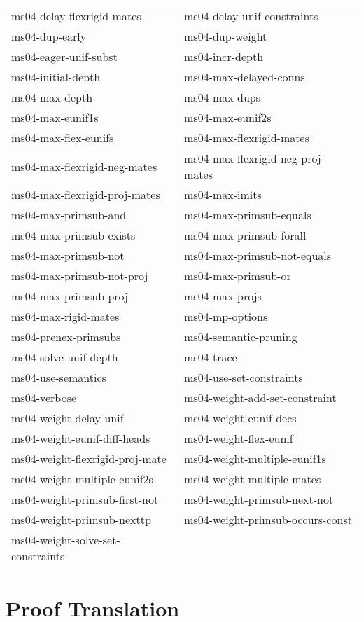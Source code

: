 \begin{description}
\begin{tabular}{l l}
ms04-delay-flexrigid-mates&ms04-delay-unif-constraints\\
ms04-dup-early&ms04-dup-weight\\
ms04-eager-unif-subst&ms04-incr-depth\\
ms04-initial-depth&ms04-max-delayed-conns\\
ms04-max-depth&ms04-max-dups\\
ms04-max-eunif1s&ms04-max-eunif2s\\
ms04-max-flex-eunifs&ms04-max-flexrigid-mates\\
ms04-max-flexrigid-neg-mates&ms04-max-flexrigid-neg-proj-mates\\
ms04-max-flexrigid-proj-mates&ms04-max-imits\\
ms04-max-primsub-and&ms04-max-primsub-equals\\
ms04-max-primsub-exists&ms04-max-primsub-forall\\
ms04-max-primsub-not&ms04-max-primsub-not-equals\\
ms04-max-primsub-not-proj&ms04-max-primsub-or\\
ms04-max-primsub-proj&ms04-max-projs\\
ms04-max-rigid-mates&ms04-mp-options\\
ms04-prenex-primsubs&ms04-semantic-pruning\\
ms04-solve-unif-depth&ms04-trace\\
ms04-use-semantics&ms04-use-set-constraints\\
ms04-verbose&ms04-weight-add-set-constraint\\
ms04-weight-delay-unif&ms04-weight-eunif-decs\\
ms04-weight-eunif-diff-heads&ms04-weight-flex-eunif\\
ms04-weight-flexrigid-proj-mate&ms04-weight-multiple-eunif1s\\
ms04-weight-multiple-eunif2s&ms04-weight-multiple-mates\\
ms04-weight-primsub-first-not&ms04-weight-primsub-next-not\\
ms04-weight-primsub-nexttp&ms04-weight-primsub-occurs-const\\
ms04-weight-solve-set-constraints
\end{tabular}
\item
\end{description}

\section{Proof Translation}

